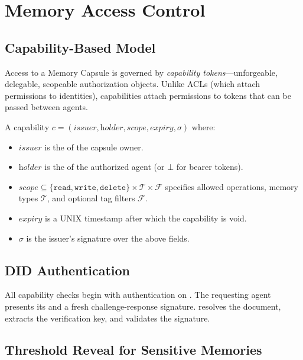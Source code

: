 \section{Memory Access Control}

\label{sec:access}

\subsection{Capability-Based Model}

Access to a Memory Capsule is governed by \emph{capability tokens}---unforgeable, delegable, scopeable authorization objects. Unlike ACLs (which attach permissions to identities), capabilities attach permissions to tokens that can be passed between agents.

\begin{definition}
A capability $c = (\textit{issuer}, \textit{holder}, \textit{scope}, \textit{expiry}, \sigma)$ where:
\begin{itemize}
    \item $\textit{issuer}$ is the \DID{} of the capsule owner.
    \item $\textit{holder}$ is the \DID{} of the authorized agent (or $\bot$ for bearer tokens).
    \item $\textit{scope} \subseteq \{\texttt{read}, \texttt{write}, \texttt{delete}\} \times \mathcal{T} \times \mathcal{F}$ specifies allowed operations, memory types $\mathcal{T}$, and optional tag filters $\mathcal{F}$.
    \item $\textit{expiry}$ is a UNIX timestamp after which the capability is void.
    \item $\sigma$ is the issuer's signature over the above fields.
\end{itemize}
\end{definition}

\subsection{DID Authentication}

All capability checks begin with \DID{} authentication on \IChain{}. The requesting agent presents its \DID{} and a fresh challenge-response signature. \IChain{} resolves the \DID{} document, extracts the verification key, and validates the signature.

\subsection{Threshold Reveal for Sensitive Memories}

